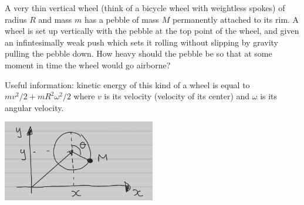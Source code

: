 \documentclass[12pt]{article}
\begin{document}
\begin{problem}{2}
A very thin vertical wheel (think of a bicycle wheel with weightless spokes) of
radius $R$ and mass $m$ has a pebble of mass $M$ permanently attached to its
rim. A wheel is set up vertically with the pebble at the top point of the wheel,
and given an infintesimally weak push which sets it rolling without slipping by
gravity pulling the pebble down. How heavy should the pebble be so that at some
moment in time the wheel would go airborne?

Useful information: kinetic energy of this kind of a wheel is equal to
$mv^2/2+mR^2\omega^2/2$ where $v$ is its velocity (velocity of its center) and
$\omega$ is its angular velocity.

\begin{solution}
    \begin{center}
        \includegraphics[width=0.5\textwidth]{hw2_p2.jpg} 
    \end{center} 


\end{solution}
\end{problem}
\end{document}
